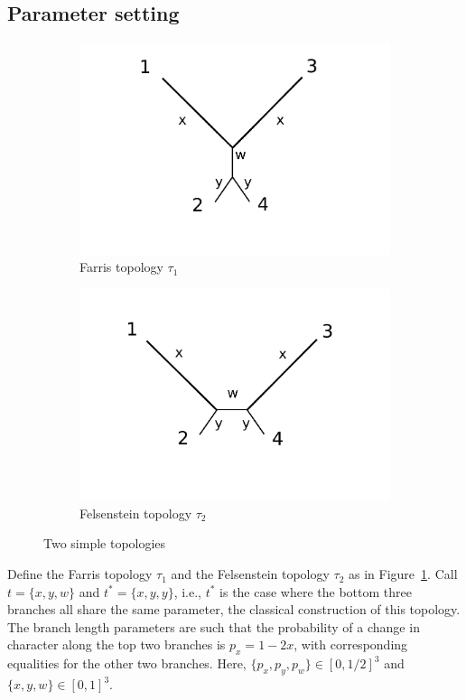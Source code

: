 \documentclass[a4paper]{article}
\begin{document}
\subsection{Parameter setting}

\begin{figure}
\centering
\begin{subfigure}{.45\linewidth}
\centering
\includegraphics[width=.95\textwidth]{farris_blank}
\caption[short]{Farris topology $\tau_1$}
\end{subfigure}
\begin{subfigure}{.45\linewidth}
\centering
\includegraphics[width=.95\textwidth]{felsenstein_blank}
\caption[short]{Felsenstein topology $\tau_2$}
\end{subfigure}
\caption{Two simple topologies}
\label{fig:farris-fels-top}
\end{figure}

Define the Farris topology $\tau_1$ and the Felsenstein topology $\tau_2$ as in Figure~\ref{fig:farris-fels-top}.
Call $t=\{x,y,w\}$ and $t^*=\{x,y,y\}$, i.e., $t^*$ is the case where the bottom three branches all share the same parameter, the classical construction of this topology.
The branch length parameters are such that the probability of a change in character along the top two branches is $p_x=1-2x$, with corresponding equalities for the other two branches.
Here, $\{p_x,p_y,p_w\}\in[0,1/2]^3$ and $\{x,y,w\}\in[0,1]^3$.
\end{document}
